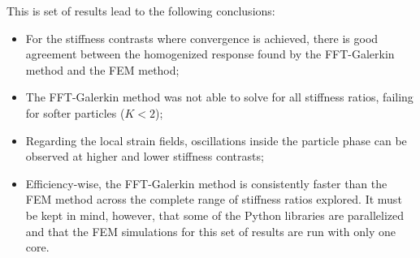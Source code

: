 This is set of results lead to the following conclusions:
\begin{itemize}
  \item For the stiffness contrasts where convergence is achieved, there is good agreement between the homogenized response found by the FFT-Galerkin method and the FEM method;
  \item The FFT-Galerkin method was not able to solve for all stiffness ratios, failing for softer particles (\(K<2\));
  \item Regarding the local strain fields, oscillations inside the particle phase can be observed at higher and lower stiffness contrasts;
  \item Efficiency-wise, the FFT-Galerkin method is consistently faster than the FEM method across the complete range of stiffness ratios explored.
  It must be kept in mind, however, that some of the Python libraries are parallelized and that the FEM simulations for this set of results are run with only one core.
\end{itemize}

